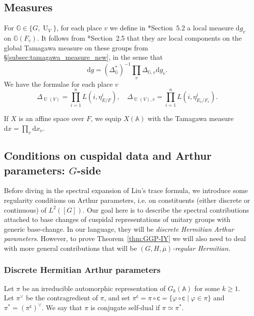 \documentclass[letterpaper,11pt]{amsart}
\newcommand{\bA}{\mathbb{A}}
\newcommand{\bG}{\mathbb{G}}
\newcommand{\rd}{\mathrm{d}}
\newcommand{\sfc}{\mathsf{c}}
\newcommand{\<}{\negthickspace}
\DeclareMathOperator{\U}{U}
\theoremstyle{definition}
\theoremstyle{plain}
\theoremstyle{remark}
\numberwithin{equation}{section}
\begin{document}
\subsection{Measures}
\label{subsec:measure_part1}
For $\bG \in \{G, \U_V\}$, for each place $v$ we define in \cite{BLX2}*{Section~5.2} a local measure $\rd g_v$ on $\bG(F_v)$. It follows from \cite{BP}*{Section~2.5} that they are local components on the global Tamagawa measure on these groups from \S\ref{subsec:tamagawa_measure_new}, in the sense that
     \begin{equation}
     \label{eq:Tamagawa_facto}
        \rd g = (\Delta_{\bG}^*)^{-1} \prod_v \Delta_{\bG,v} \rd g_v.
    \end{equation}
We have the formulae for each place $v$
\begin{equation}
    \label{eq:delta_U_formula}
    \Delta_{\U(V)}=\prod_{i=1}^n L(i,\eta_{E/F}^i), \quad \Delta_{\U(V),v}=\prod_{i=1}^n L(i,\eta_{E_v/F_v}^i).
\end{equation}

If $X$ is an affine space over $F$, we equip $X(\bA)$ with the Tamagawa measure $\rd x=\prod_v \rd x_v$.

\subsection{Conditions on cuspidal data and Arthur parameters: $G$-side}
\label{subsec:reg_conditions_G}
Before diving in the spectral expansion of Liu's trace formula, we introduce some regularity conditions on Arthur parameters, i.e. on constituents (either discrete or continuous) of $L^2([G])$. Our goal here is to describe the spectral contributions attached to base changes of cuspidal representations of unitary groups with generic base-change. In our language, they will be \emph{discrete Hermitian Arthur parameters}. However, to prove Theorem~\ref{thm:GGP-IY} we will also need to deal with more general contributions that will be \emph{$(G,H,\overline{\mu})$-regular Hermitian}.


\subsubsection{Discrete Hermitian Arthur parameters}
\label{subsubsec:discreteHermitianArthur}

Let $\pi$ be an irreducible automorphic
representation of $G_k(\bA)$ for some $k \geq 1$. Let $\pi^\vee$ be the contragredient of
$\pi$, and set $\pi^\sfc = \pi \circ \sfc = \{ \varphi \circ \sfc \mid \varphi \in \pi\}$
and $\pi^* = (\pi^\sfc)^\vee$. We say that $\pi$ is conjugate self-dual if
$\pi\simeq \pi^*$.
\end{document}
